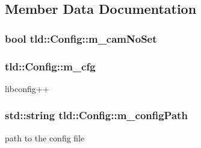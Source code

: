 \subsection{Member Data Documentation}
\hypertarget{classtld_1_1Config_a02c8e73d04439a88f1c89557b3aae875}{
\subsubsection[{m\-\_\-cam\-No\-Set}]{\setlength{\rightskip}{0pt plus 5cm}bool tld\-::\-Config\-::m\-\_\-cam\-No\-Set\hspace{0.3cm}{\ttfamily [private]}}}\label{classtld_1_1Config_a02c8e73d04439a88f1c89557b3aae875}
\hypertarget{classtld_1_1Config_af86a3db9ddcd73af323b3f8a1e5c7c0e}{
\subsubsection[{m\-\_\-cfg}]{ tld\-::\-Config\-::m\-\_\-cfg\hspace{0.3cm}{\ttfamily [private]}}}\label{classtld_1_1Config_af86a3db9ddcd73af323b3f8a1e5c7c0e}


libconfig++ 

\hypertarget{classtld_1_1Config_a20d627bd78d0dece60cfcbb872daa199}{
\subsubsection[{m\-\_\-config\-Path}]{\setlength{\rightskip}{0pt plus 5cm}std\-::string tld\-::\-Config\-::m\-\_\-config\-Path\hspace{0.3cm}{\ttfamily [private]}}}\label{classtld_1_1Config_a20d627bd78d0dece60cfcbb872daa199}


path to the config file 

